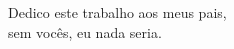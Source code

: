 
\begin{dedicatoria}
   \vspace*{\fill}
   \begin{flushright}
   \noindent
	Dedico este trabalho aos meus pais, \\
	sem vocês, eu nada seria.
   \end{flushright}

\end{dedicatoria}
